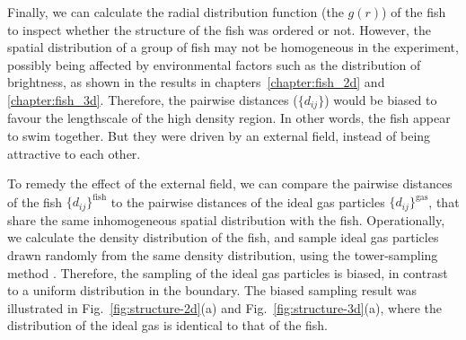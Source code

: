 \documentclass[11pt,twoside]{report}
\begin{document}


Finally, we can calculate the radial distribution function (the $g(r)$) of the fish to inspect whether the structure of the fish was ordered or not. However, the spatial distribution of a group of fish may not be homogeneous in the experiment, possibly being affected by environmental factors such as the distribution of brightness, as shown in the results in chapters~\ref{chapter:fish_2d} and \ref{chapter:fish_3d}. Therefore, the pairwise distances ($\{ d_{ij} \}$) would be biased to favour the lengthscale of the high density region. In other words, the fish appear to swim together. But they were driven by an external field, instead of being attractive to each other.

To remedy the effect of the external field, we can compare the pairwise distances of the fish $\{d_{ij}\}^\textrm{fish}$ to the pairwise distances of the ideal gas particles $\{d_{ij}\}^\textrm{gas}$, that share the same inhomogeneous spatial distribution with the fish.
Operationally, we calculate the density distribution of the fish, and sample ideal gas particles drawn randomly from the same density distribution, using the tower-sampling method \cite{krauth2006}.
Therefore, the sampling of the ideal gas particles is biased, in contrast to a uniform distribution in the boundary. The biased sampling result was illustrated in Fig.~\ref{fig:structure-2d}(a) and Fig.~\ref{fig:structure-3d}(a), where the distribution of the ideal gas is identical to that of the fish.
\end{document}
